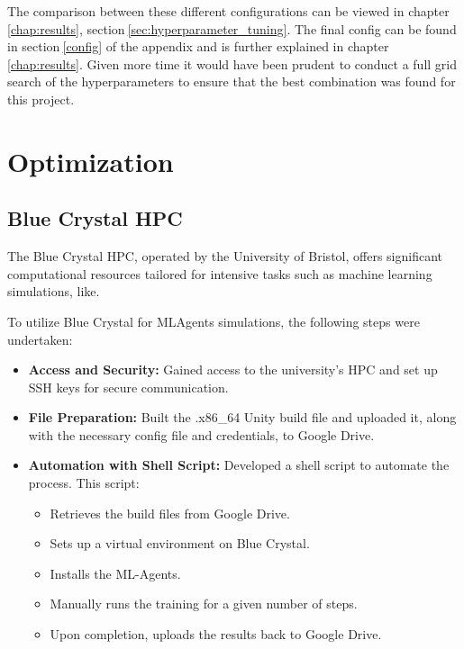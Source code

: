 The comparison between these different configurations can be viewed in chapter$~$\ref{chap:results}, section$~$\ref{sec:hyperparameter_tuning}. The final config can be found in section$~$\ref{config} of the appendix and is further explained in chapter$~$\ref{chap:results}. Given more time it would have been prudent to conduct a full grid search of the hyperparameters to ensure that the best combination was found for this project.


\section{Optimization}


\subsection{Blue Crystal HPC}

The Blue Crystal HPC, operated by the University of Bristol, offers significant computational resources tailored for intensive tasks such as machine learning simulations, like. 

To utilize Blue Crystal for MLAgents simulations, the following steps were undertaken:

\begin{itemize}
    \item \textbf{Access and Security:} Gained access to the university's HPC and set up SSH keys for secure communication.
    \item \textbf{File Preparation:} Built the .x86\_64 Unity build file and uploaded it, along with the necessary config file and credentials, to Google Drive.
    \item \textbf{Automation with Shell Script:} Developed a shell script to automate the process. This script:
    \begin{itemize}
        \item Retrieves the build files from Google Drive.
        \item Sets up a virtual environment on Blue Crystal.
        \item Installs the ML-Agents.
        \item Manually runs the training for a given number of steps.
        \item Upon completion, uploads the results back to Google Drive.
    \end{itemize}
\end{itemize}

